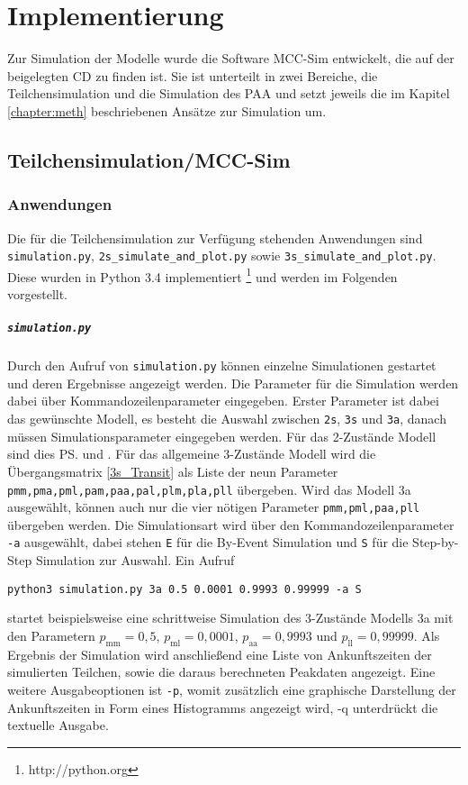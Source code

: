 \chapter{Implementierung}
\label{chapter:imp}

Zur Simulation der Modelle wurde die Software MCC-Sim entwickelt, die auf der beigelegten CD zu finden ist.
Sie ist unterteilt in zwei Bereiche, die Teilchensimulation und die Simulation des PAA und setzt jeweils die im Kapitel \ref{chapter:meth} beschriebenen Ansätze zur Simulation um.


\section{Teilchensimulation/MCC-Sim}


\subsection{Anwendungen}
Die für die Teilchensimulation zur Verfügung stehenden Anwendungen sind \texttt{simulation.py}, \verb!2s_simulate_and_plot.py! sowie  \verb!3s_simulate_and_plot.py!. Diese wurden in Python 3.4 implementiert \footnote{http://python.org} und werden im Folgenden vorgestellt.

\paragraph{\texttt{simulation.py}}

Durch den Aufruf von \texttt{simulation.py} können einzelne Simulationen gestartet und deren Ergebnisse angezeigt werden.
Die Parameter für die Simulation werden dabei über Kommandozeilenparameter eingegeben. Erster Parameter ist dabei das gewünschte Modell, es besteht die Auswahl zwischen \texttt{2s}, \texttt{3s} und \texttt{3a}, danach müssen Simulationsparameter eingegeben werden. Für das 2-Zustände Modell sind dies \ps und \pm. Für das allgemeine 3-Zustände Modell wird die Übergangsmatrix \ref{3s_Transit} als Liste der neun Parameter \verb!pmm,pma,pml,pam,paa,pal,plm,pla,pll! übergeben. Wird das Modell 3a ausgewählt, können auch nur die vier nötigen Parameter \verb!pmm,pml,paa,pll! übergeben werden.
Die Simulationsart wird über den Kommandozeilenparameter \texttt{-a} ausgewählt, dabei stehen \texttt{E} für die By-Event Simulation und \texttt{S} für die Step-by-Step Simulation zur Auswahl.
Ein Aufruf
\begin{verbatim}
python3 simulation.py 3a 0.5 0.0001 0.9993 0.99999 -a S
\end{verbatim}
startet beispielsweise eine schrittweise Simulation des 3-Zustände Modells 3a mit den Parametern $p_{\text{mm}} = 0,5$, $p_{\text{ml}} = 0,0001$, $p_{\text{aa}} = 0,9993$ und $p_{\text{ll}} = 0,99999$. Als Ergebnis der Simulation wird anschließend eine Liste von Ankunftszeiten der simulierten Teilchen, sowie die daraus berechneten Peakdaten angezeigt. Eine weitere Ausgabeoptionen ist \texttt{-p}, womit zusätzlich eine graphische Darstellung der Ankunftszeiten in Form eines Histogramms angezeigt wird, -q unterdrückt die textuelle Ausgabe.

